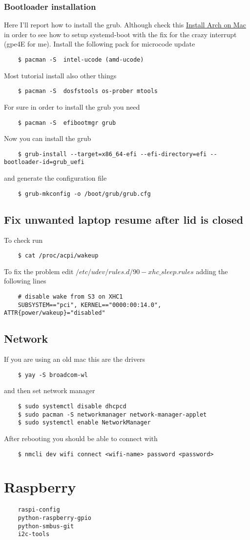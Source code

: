 \documentclass[12pt]{article}
\begin{document}
\subsubsection*{Bootloader installation}
Here I'll report how to install the grub. Although check this \href{https://medium.com/@laurynas.karvelis_95228/install-arch-linux-on-macbook-pro-11-2-retina-install-guide-for-year-2017-2034ceed4cb2}{Install Arch on Mac} in order to see how to setup systemd-boot with the fix for the crazy interrupt (gpe4E for me).
Install the following pack for microcode update
\begin{lstlisting}
    $ pacman -S  intel-ucode (amd-ucode)
\end{lstlisting}
Most tutorial install also other things
\begin{lstlisting}
    $ pacman -S  dosfstools os-prober mtools
\end{lstlisting}
For sure in order to install the grub you need
\begin{lstlisting}
    $ pacman -S  efibootmgr grub
\end{lstlisting}
Now you can install the grub
\begin{lstlisting}
    $ grub-install --target=x86_64-efi --efi-directory=efi --bootloader-id=grub_uefi
\end{lstlisting}
and generate the configuration file
\begin{lstlisting}
    $ grub-mkconfig -o /boot/grub/grub.cfg
\end{lstlisting}

\subsection*{Fix unwanted laptop resume after lid is closed}
To check run
\begin{lstlisting}
    $ cat /proc/acpi/wakeup
\end{lstlisting}
To fix the problem edit $/etc/udev/rules.d/90-xhc\_sleep.rules$ adding the following lines
\begin{lstlisting}
    # disable wake from S3 on XHC1
    SUBSYSTEM=="pci", KERNEL=="0000:00:14.0", ATTR{power/wakeup}="disabled"
\end{lstlisting}

\subsection*{Network}
If you are using an old mac this are the drivers
\begin{lstlisting}
    $ yay -S broadcom-wl
\end{lstlisting}
and then set network manager
\begin{lstlisting}
    $ sudo systemctl disable dhcpcd
    $ sudo pacman -S networkmanager network-manager-applet
    $ sudo systemctl enable NetworkManager
\end{lstlisting}
After rebooting you should be able to connect with
\begin{lstlisting}
    $ nmcli dev wifi connect <wifi-name> password <password>
\end{lstlisting}

\section*{Raspberry}
\begin{lstlisting}
    raspi-config
    python-raspberry-gpio
    python-smbus-git
    i2c-tools
\end{lstlisting}
\end{document}
